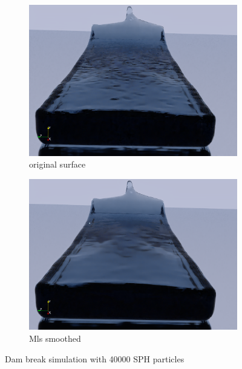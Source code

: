\begin{figure}
	\begin{center}
		\begin{subfigure}[b]{\textwidth}
			\includegraphics[width=\textwidth]{figures/DamBreackRaytracedNaiveMC.png}
			\caption{original surface}
			\label{fig:dam_break_zb}
		\end{subfigure}
		\begin{subfigure}[b]{\textwidth}
			\includegraphics[width=\textwidth]{figures/DamBreackRaytracedNaiveMCMls.png}
			\caption{Mls smoothed}
			\label{fig:dam_break_zb}
		\end{subfigure}
	\end{center}
	\caption{Dam break simulation with  40000 SPH particles} \label{fig:crown_zb_mls}
\end{figure}

